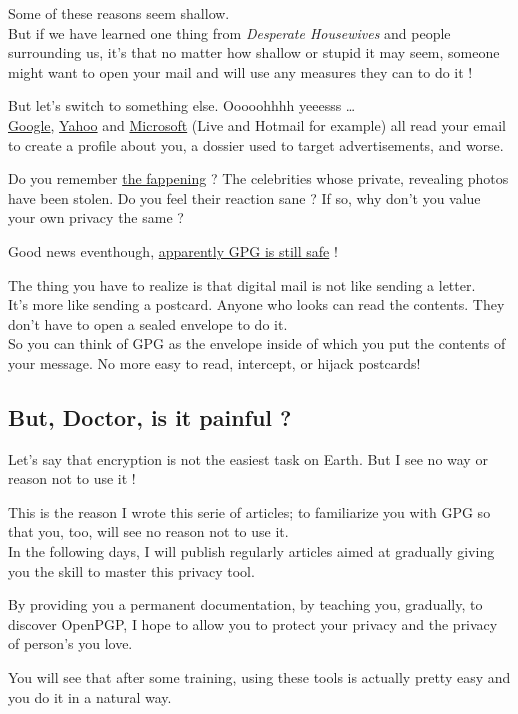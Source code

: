 Some of these reasons seem shallow.\\But if we have learned one thing
from \emph{Desperate Housewives} and people surrounding us, it's that no
matter how shallow or stupid it may seem, someone might want to open
your mail and will use any measures they can to do it !

But let's switch to something else. Ooooohhhh yeeesss
\ldots{}\\\href{http://www.huffingtonpost.com/2014/04/15/gmail-ads_n_5149032.html}{Google},
\href{http://motherboard.vice.com/read/looking-up-symptoms-online-these-companies-are-collecting-your-data}{Yahoo}
and \href{https://tosdr.org/\#microsoft}{Microsoft} (Live and Hotmail
for example) all read your email to create a profile about you, a
dossier used to target advertisements, and worse.

Do you remember
\href{http://www.theguardian.com/world/2014/sep/01/nude-photos-of-jennifer-lawrence-and-others-posted-online-by-alleged-hacker}{the
fappening} ? The celebrities whose private, revealing photos have been
stolen. Do you feel their reaction sane ? If so, why don't you value
your own privacy the same ?

Good news eventhough,
\href{http://www.ginjfo.com/actualites/politique-et-economie/espionnage-nsa-depose-les-armes-devant-certaines-solutions-cryptage-20141230}{apparently
GPG is still safe} !

The thing you have to realize is that digital mail is not like sending a
letter.\\It's more like sending a postcard. Anyone who looks can read
the contents. They don't have to open a sealed envelope to do it.\\So
you can think of GPG as the envelope inside of which you put the
contents of your message. No more easy to read, intercept, or hijack
postcards!

\subsection{But, Doctor, is it painful ?}\label{but-doctor-is-it-painful}

Let's say that encryption is not the easiest task on Earth. But I see no
way or reason not to use it !

This is the reason I wrote this serie of articles; to familiarize you
with GPG so that you, too, will see no reason not to use it.\\In the
following days, I will publish regularly articles aimed at gradually
giving you the skill to master this privacy tool.

By providing you a permanent documentation, by teaching you, gradually,
to discover OpenPGP, I hope to allow you to protect your privacy and the
privacy of person's you love.

You will see that after some training, using these tools is actually
pretty easy and you do it in a natural way.
